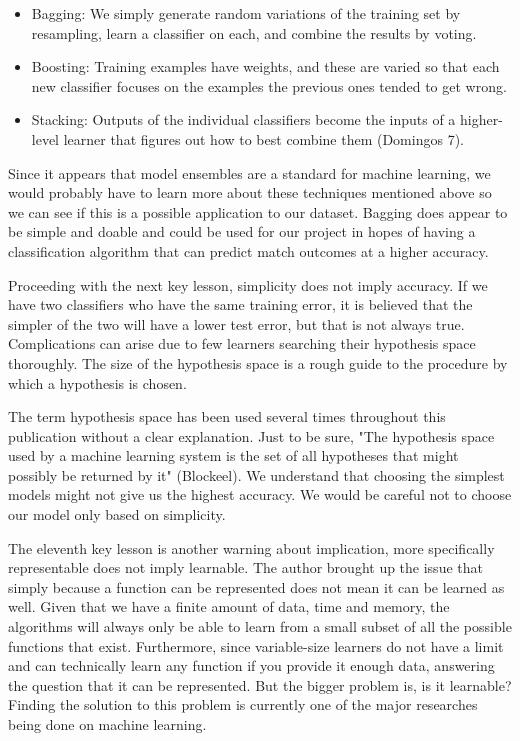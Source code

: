 \documentclass[a4paper,12pt]{report}
\begin{document}
\begin{itemize}[,]
    \setlength\itemsep{-.1cm}
    \item Bagging: We simply generate random variations of the training set by resampling, learn a classifier on each, and combine the results by voting.
    \item Boosting: Training examples have weights, and these are varied so that each new classifier focuses on the examples the previous ones tended to get wrong.
    \item Stacking: Outputs of the individual classifiers become the inputs of a higher-level learner that figures out how to best combine them (Domingos 7).
\end{itemize}

Since it appears that model ensembles are a standard for machine learning, we would probably have to learn more about these techniques mentioned above so we can see if this is a possible application to our dataset. Bagging does appear to be simple and doable and could be used for our project in hopes of having a classification algorithm that can predict match outcomes at a higher accuracy.

Proceeding with the next key lesson, simplicity does not imply accuracy. If we have two classifiers who have the same training error, it is believed that the simpler of the two will have a lower test error, but that is not always true. Complications can arise due to few learners searching their hypothesis space thoroughly. The size of the hypothesis space is a rough guide to the procedure by which a hypothesis is chosen.

The term hypothesis space has been used several times throughout this publication without a clear explanation. Just to be sure, "The hypothesis space used by a machine learning system is the set of all hypotheses that might possibly be returned by it" (Blockeel). We understand that choosing the simplest models might not give us the highest accuracy. We would be careful not to choose our model only based on simplicity.

The eleventh key lesson is another warning about implication, more specifically representable does not imply learnable. The author brought up the issue that simply because a function can be represented does not mean it can be learned as well. Given that we have a finite amount of data, time and memory, the algorithms will always only be able to learn from a small subset of all the possible functions that exist. Furthermore, since variable-size learners do not have a limit and can technically learn any function if you provide it enough data, answering the question that it can be represented. But the bigger problem is, is it learnable? Finding the solution to this problem is currently one of the major researches being done on machine learning.
\end{document}

